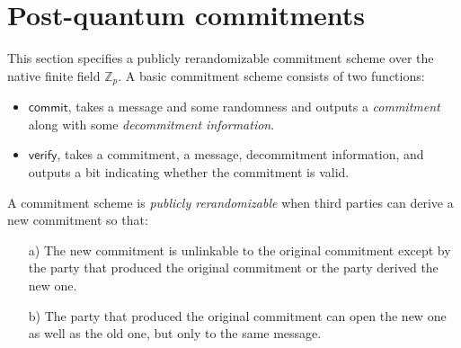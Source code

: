 \section{Post-quantum commitments}
\label{section:commitments}

This section specifies a publicly rerandomizable commitment scheme over the native finite field $\mathbb{Z}_p$. A basic commitment scheme consists of two functions:
\begin{itemize}
 \item $\mathsf{commit}$, takes a message and some randomness and outputs a \emph{commitment} along with some \emph{decommitment information}.
 \item $\mathsf{verify}$, takes a commitment, a message, decommitment information, and outputs a bit indicating whether the commitment is valid.
\end{itemize}

A commitment scheme is \emph{publicly rerandomizable} when third parties can derive a new commitment so that:
\begin{itemize}
\item[a)] The new commitment is unlinkable to the original commitment except by the party that produced the original commitment or the party derived the new one.
\item[b)] The party that produced the original commitment can open the new one as well as the old one, but only to the same message.
\end{itemize}

